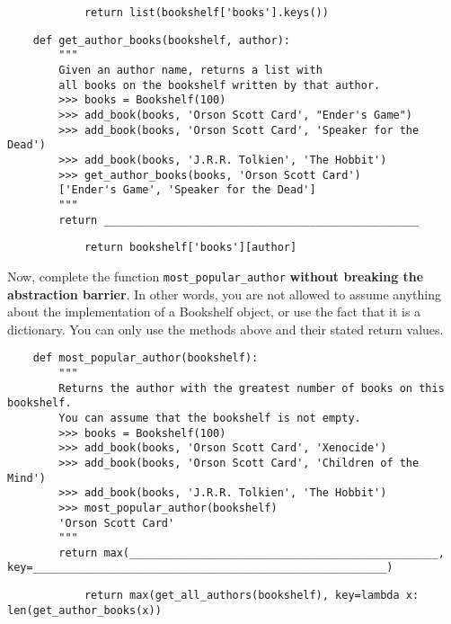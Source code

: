     \begin{solution}[1in]
        \begin{lstlisting}
            return list(bookshelf['books'].keys())
        \end{lstlisting}
    \end{solution}

    \begin{lstlisting}
    def get_author_books(bookshelf, author):
        """
        Given an author name, returns a list with
        all books on the bookshelf written by that author.
        >>> books = Bookshelf(100)
        >>> add_book(books, 'Orson Scott Card', "Ender's Game")
        >>> add_book(books, 'Orson Scott Card', 'Speaker for the Dead')
        >>> add_book(books, 'J.R.R. Tolkien', 'The Hobbit')
        >>> get_author_books(books, 'Orson Scott Card')
        ['Ender's Game', 'Speaker for the Dead']
        """
        return _________________________________________________
    \end{lstlisting}

    \begin{solution}[1in]
        \begin{lstlisting}
            return bookshelf['books'][author] 
        \end{lstlisting}
    \end{solution}

    \newpage
    Now, complete the function \lstinline{most_popular_author} \textbf{without breaking the abstraction barrier}.
    In other words, you are not allowed to assume anything about the implementation of a Bookshelf object, or
    use the fact that it is a dictionary. You can only use the methods above and their stated return values.

    \begin{lstlisting}
    def most_popular_author(bookshelf):
        """
        Returns the author with the greatest number of books on this bookshelf.
        You can assume that the bookshelf is not empty.
        >>> books = Bookshelf(100)
        >>> add_book(books, 'Orson Scott Card', 'Xenocide')
        >>> add_book(books, 'Orson Scott Card', 'Children of the Mind')
        >>> add_book(books, 'J.R.R. Tolkien', 'The Hobbit')
        >>> most_popular_author(bookshelf)
        'Orson Scott Card'
        """
        return max(________________________________________________, key=_______________________________________________________)
    \end{lstlisting}


    \begin{solution}[1in]
        \begin{lstlisting}
            return max(get_all_authors(bookshelf), key=lambda x: len(get_author_books(x))
        \end{lstlisting}
    \end{solution}


